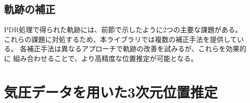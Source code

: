 


\subsection{軌跡の補正}

PDR処理で得られた軌跡には、前節で示したように2つの主要な課題がある。
これらの課題に対処するため、本ライブラリでは複数の補正手法を提供している。
各補正手法は異なるアプローチで軌跡の改善を試みるが、これらを効果的に
組み合わせることで、より高精度な位置推定が可能となる。







\section{気圧データを用いた3次元位置推定}



